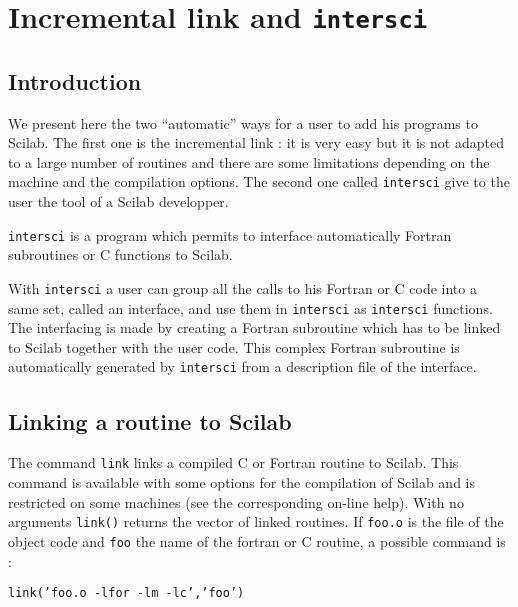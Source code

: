 \chapter{Incremental link and {\tt intersci}}
\label{intersci}

\newcommand{\version}{Version 2.1}
\newcommand{\T}[1]{{\tt #1}}
\newcommand{\M}[1]{$<${\em #1}$>$}
\newcommand{\ie}{\mbox{i.e.}}

\section{Introduction}
We present here the two ``automatic''  ways for a user to add his programs to 
Scilab. The first one 
is the incremental link : it is very easy but it is not adapted to a large
number of routines and there are some limitations depending on the machine
and the compilation options. The second one called {\tt intersci} give to the
user the tool of a Scilab developper.

{\tt intersci} is a program which permits to interface automatically Fortran 
subroutines or C functions to Scilab.

With {\tt intersci} a user can group all the calls to his Fortran or C code into a same set,
called an interface, and use them in {\tt intersci} as {\tt intersci} 
functions. The  interfacing
is made by creating a Fortran subroutine which has to be linked to Scilab 
together with the user code. This complex Fortran subroutine is automatically 
generated by {\tt intersci} from a description file of the interface.

\section{Linking a routine to Scilab}
The command {\tt link} links a compiled C or Fortran routine to Scilab.
This command is available with some options for the compilation of Scilab
and is restricted on some machines (see the corresponding on-line help).
With no arguments {\tt link()} returns the vector of linked routines.
If {\tt foo.o} is the file of the object code and {\tt foo}  the name of the 
fortran or C routine, a possible command is :

{\tt link('foo.o -lfor -lm -lc','foo')}

